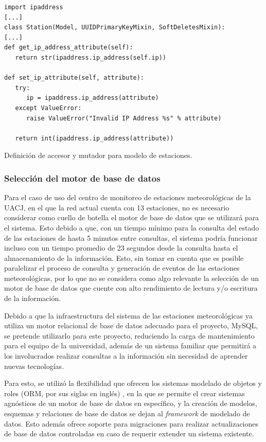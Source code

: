 \begin{listing}
\begin{verbatim}
import ipaddress
[...]
class Station(Model, UUIDPrimaryKeyMixin, SoftDeletesMixin):
[...]
def get_ip_address_attribute(self):
   return str(ipaddress.ip_address(self.ip))

def set_ip_attribute(self, attribute):
   try:
      ip = ipaddress.ip_address(attribute)
   except ValueError:
      raise ValueError("Invalid IP Address %s" % attribute)

   return int(ipaddress.ip_address(attribute))
\end{verbatim}
\caption{Definición de accesor y mutador para modelo de estaciones.}
\label{lst:model-station-mutator}
\end{listing}

\subsubsection{Selección del motor de base de datos}

Para el caso de uso del centro de monitoreo de estaciones meteorológicas de la UACJ, en el que la red actual cuenta con 13 estaciones, no es necesario considerar como cuello de botella el motor de base de datos que se utilizará para el sistema. Esto debido a que, con un tiempo mínimo para la consulta del estado de las estaciones de hasta 5 minutos entre consultas, el sistema podría funcionar incluso con un tiempo promedio de 23 segundos desde la consulta hasta el almacenamiento de la información. Esto, sin tomar en cuenta que es posible paralelizar el proceso de consulta y generación de eventos de las estaciones meteorológicas, por lo que no se considera como algo relevante la selección de un motor de base de datos que cuente con alto rendimiento de lectura y/o escritura de la información.

Debido a que la infraestructura del sistema de las estaciones meteorológicas ya utiliza un motor relacional de base de datos adecuado para el proyecto, MySQL, se pretende utilizarlo para este proyecto, reduciendo la carga de mantenimiento para el equipo de la universidad, además de un sistema familiar que permitirá a los involucrados realizar consultas a la información sin necesidad de aprender nuevas tecnologías.

Para esto, se utilizó la flexibilidad que ofrecen los sistemas modelado de objetos y roles (ORM, por sus siglas en inglés) \cite{Halpin2006}, en la que se permite el crear sistemas agnósticos de un motor de base de datos en específico, y la creación de modelos, esquemas y relaciones de base de datos se dejan al \textit{framework} de modelado de datos. Esto además ofrece soporte para migraciones para realizar actualizaciones de base de datos controladas en caso de requerir extender un sistema existente.

